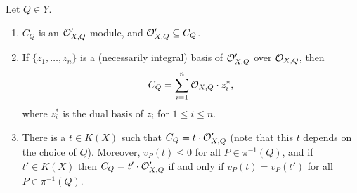 \begin{prop}\label{factsaboutc'}
Let $Q\in Y$. 
 \begin{enumerate}
  \item $C_Q$ is an ${\cal O}_{X,Q}'$-module, and ${\cal O}_{X,Q}' \subseteq C_Q$.
  \item If $\{z_1,\ldots ,z_n\}$ is a (necessarily integral) basis of ${\cal O}_{X,Q}'$ over ${\cal O}_{X,Q}$, then 
  \[
   C_Q = \sum_{i=1}^n {\cal O}_{X,Q}\cdot z_i^*,
  \]
where $z_i^*$ is the dual basis of $z_i$ for $1\leq i \leq n$.
  \item There is a $t\in K(X)$ such that $C_Q = t\cdot {\cal O}_{X,Q}'$ (note that this $t$ depends on the choice of $Q$).
  Moreover, $v_P(t) \leq 0$ for all $P\in \pi^{-1}(Q)$, and if $t'\in K(X)$ then $C_Q=t'\cdot {\cal O}_{X,Q}'$ if and only if $v_P(t) = v_P(t')$ for all $P\in \pi^{-1}(Q)$.

 \end{enumerate}
\end{prop}

